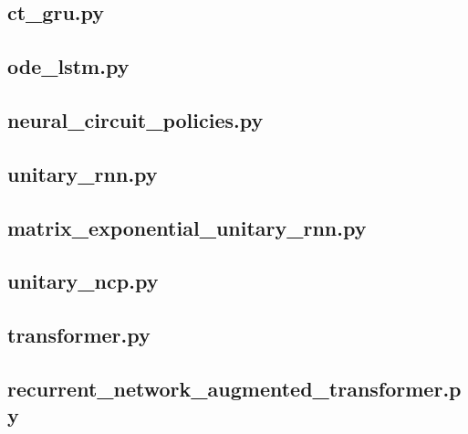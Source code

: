 \documentclass[draft,final]{vutinfth} %
\begin{document}
\subsection{ct\_gru.py}


\subsection{ode\_lstm.py}


\subsection{neural\_circuit\_policies.py}


\subsection{unitary\_rnn.py}


\subsection{matrix\_exponential\_unitary\_rnn.py}


\subsection{unitary\_ncp.py}


\subsection{transformer.py}


\subsection{recurrent\_network\_augmented\_transformer.py}

\end{document}
